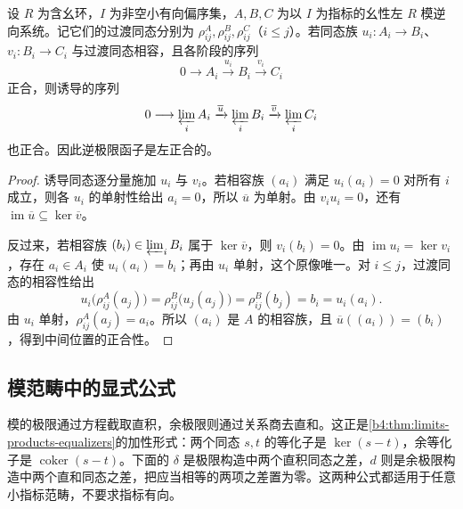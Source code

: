 \begin{proposition}[逆极限的左正合性]\label{b4:prop:inverse-limits-left-exact}
	设 \(R\) 为含幺环，\(I\) 为非空小有向偏序集，\(A,B,C\) 为以 \(I\) 为指标的幺性左 \(R\) 模逆向系统。记它们的过渡同态分别为 \(\rho^A_{ij},\rho^B_{ij},\rho^C_{ij}\)（\(i\le j\)）。若同态族 \(u_i:A_i\rightarrow B_i\)、\(v_i:B_i\rightarrow C_i\) 与过渡同态相容，且各阶段的序列
	\[
		0\longrightarrow A_i\xrightarrow{u_i}B_i \xrightarrow{v_i}C_i
	\]
	正合，则诱导的序列
	\[
		0\longrightarrow\varprojlim_iA_i \xrightarrow{\overline u}\varprojlim_iB_i \xrightarrow{\overline v}\varprojlim_iC_i
	\]
	也正合。因此逆极限函子是左正合的。
\end{proposition}
\begin{proof}
	诱导同态逐分量施加 \(u_i\) 与 \(v_i\)。若相容族 \((a_i)\) 满足 \(u_i(a_i)=0\) 对所有 \(i\) 成立，则各 \(u_i\) 的单射性给出 \(a_i=0\)，所以 \(\overline u\) 为单射。由 \(v_iu_i=0\)，还有 \(\operatorname{im}\overline u\subseteq\ker\overline v\)。

	反过来，若相容族 \((b_i)\in\varprojlim_iB_i\) 属于 \(\ker\overline v\)，则 \(v_i(b_i)=0\)。由 \(\operatorname{im}u_i=\ker v_i\)，存在 \(a_i\in A_i\) 使 \(u_i(a_i)=b_i\)；再由 \(u_i\) 单射，这个原像唯一。对 \(i\le j\)，过渡同态的相容性给出
	\[
		u_i\bigl(\rho^A_{ij}(a_j)\bigr) =\rho^B_{ij}\bigl(u_j(a_j)\bigr) =\rho^B_{ij}(b_j) =b_i=u_i(a_i).
	\]
	由 \(u_i\) 单射，\(\rho^A_{ij}(a_j)=a_i\)。所以 \((a_i)\) 是 \(A\) 的相容族，且 \(\overline u((a_i))=(b_i)\)，得到中间位置的正合性。
\end{proof}

\subsection{模范畴中的显式公式}
\label{b4:subsec:0203:03}

模的极限通过方程截取直积，余极限则通过关系商去直和。这正是\cref{b4:thm:limits-products-equalizers}的加性形式：两个同态 \(s,t\) 的等化子是 \(\ker(s-t)\)，余等化子是 \(\operatorname{coker}(s-t)\)。下面的 \(\delta\) 是极限构造中两个直积同态之差，\(d\) 则是余极限构造中两个直和同态之差，把应当相等的两项之差置为零。这两种公式都适用于任意小指标范畴，不要求指标有向。

